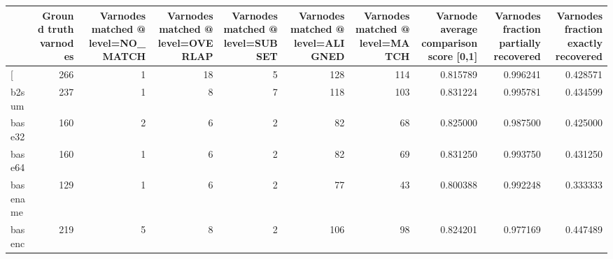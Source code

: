 \begin{tabular}{lrrrrrrrrr}
\toprule
{} &  Ground truth varnodes &  Varnodes matched @ level=NO\_MATCH &  Varnodes matched @ level=OVERLAP &  Varnodes matched @ level=SUBSET &  Varnodes matched @ level=ALIGNED &  Varnodes matched @ level=MATCH &  Varnode average comparison score [0,1] &  Varnodes fraction partially recovered &  Varnodes fraction exactly recovered \\
\midrule
[         &                    266 &                                  1 &                                18 &                                5 &                               128 &                             114 &                                0.815789 &                               0.996241 &                             0.428571 \\
b2sum     &                    237 &                                  1 &                                 8 &                                7 &                               118 &                             103 &                                0.831224 &                               0.995781 &                             0.434599 \\
base32    &                    160 &                                  2 &                                 6 &                                2 &                                82 &                              68 &                                0.825000 &                               0.987500 &                             0.425000 \\
base64    &                    160 &                                  1 &                                 6 &                                2 &                                82 &                              69 &                                0.831250 &                               0.993750 &                             0.431250 \\
basename  &                    129 &                                  1 &                                 6 &                                2 &                                77 &                              43 &                                0.800388 &                               0.992248 &                             0.333333 \\
basenc    &                    219 &                                  5 &                                 8 &                                2 &                               106 &                              98 &                                0.824201 &                               0.977169 &                             0.447489 \\

\end{tabular}
